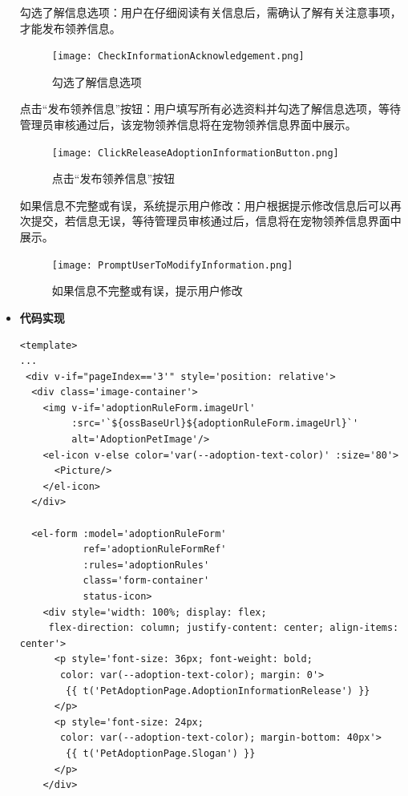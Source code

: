 \begin{itemize}
	勾选了解信息选项：用户在仔细阅读有关信息后，需确认了解有关注意事项，才能发布领养信息。
	
	\begin{figure}[H]
		\centering
		\texttt{[image: CheckInformationAcknowledgement.png]}
		\caption{勾选了解信息选项}
		\label{fig:Check information acknowledgement}
	\end{figure}
	
	点击“发布领养信息”按钮：用户填写所有必选资料并勾选了解信息选项，等待管理员审核通过后，该宠物领养信息将在宠物领养信息界面中展示。
	
	\begin{figure}[H]
		\centering
		\texttt{[image: ClickReleaseAdoptionInformationButton.png]} 
		\caption{点击“发布领养信息”按钮}
		\label{fig:Click release adoption information button}
	\end{figure}
	
	如果信息不完整或有误，系统提示用户修改：用户根据提示修改信息后可以再次提交，若信息无误，等待管理员审核通过后，信息将在宠物领养信息界面中展示。
	
	\begin{figure}[H]
		\centering
		\texttt{[image: PromptUserToModifyInformation.png]} 
		\caption{如果信息不完整或有误，提示用户修改}
		\label{fig:Prompt user to modify information}
	\end{figure}
	
	\item[] \textbf{代码实现}
	\begin{verbatim}
<template>
...
 <div v-if="pageIndex=='3'" style='position: relative'>
  <div class='image-container'>
    <img v-if='adoptionRuleForm.imageUrl'
         :src='`${ossBaseUrl}${adoptionRuleForm.imageUrl}`'
         alt='AdoptionPetImage'/>
    <el-icon v-else color='var(--adoption-text-color)' :size='80'>
      <Picture/>
    </el-icon>
  </div>
	
  <el-form :model='adoptionRuleForm'
           ref='adoptionRuleFormRef'
           :rules='adoptionRules'
           class='form-container'
           status-icon>
    <div style='width: 100%; display: flex;
     flex-direction: column; justify-content: center; align-items: center'>
      <p style='font-size: 36px; font-weight: bold;
       color: var(--adoption-text-color); margin: 0'>
        {{ t('PetAdoptionPage.AdoptionInformationRelease') }}
      </p>
      <p style='font-size: 24px;
       color: var(--adoption-text-color); margin-bottom: 40px'>
        {{ t('PetAdoptionPage.Slogan') }}
      </p>
    </div>
	

\end{verbatim}
\end{itemize}
